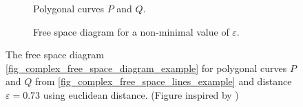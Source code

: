 \documentclass[
oneside,
fontsize=11pt
]{scrartcl}
\begin{document}
\begin{figure}[ht]
  \centering
  \begin{subfigure}[b]{0.45\textwidth}
      \resizebox{\textwidth}{!}{
        
      }
      \caption{Polygonal curves $P$ and $Q$.}
      \label{fig_complex_free_space_lines_example}
  \end{subfigure}
  \hfill
  \begin{subfigure}[b]{0.45\textwidth}
      \caption{Free space diagram for a non-minimal value of $\varepsilon$.}
      \label{fig_complex_free_space_diagram_example}
  \end{subfigure}
  \caption[Complex free space diagram example]{
    The free space diagram \autoref{fig_complex_free_space_diagram_example} 
    for polygonal curves $P$ and $Q$ from \autoref{fig_complex_free_space_lines_example} 
    and distance $\varepsilon = 0.73$ using euclidean distance. (Figure inspired by \cite{buchin_four_2017})}
  \label{fig_complex_free_space}
\end{figure}
\end{document}
